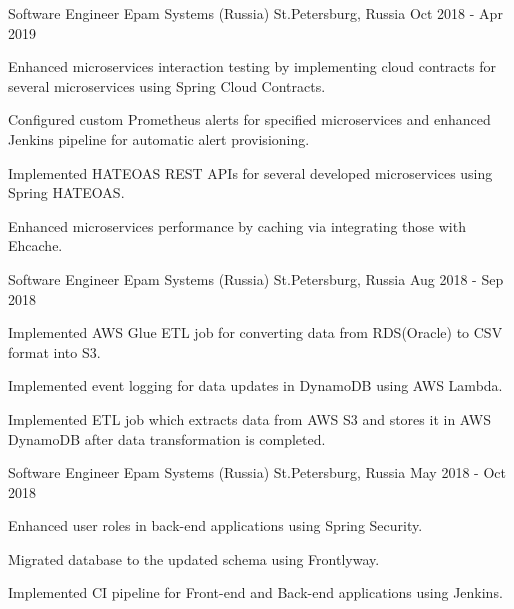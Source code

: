 \begin{cventries}
\cventry
{Software Engineer} %
{Epam Systems (Russia)} %
{St.Petersburg, Russia} %
{Oct 2018 - Apr 2019} %
{
  \begin{cvitems} %
    \item { Enhanced microservices interaction testing by implementing cloud contracts for several microservices using Spring Cloud Contracts.}
    \item {Configured custom Prometheus alerts for specified microservices and enhanced Jenkins pipeline for automatic alert provisioning.}
    \item {Implemented HATEOAS  REST APIs for several developed microservices using Spring HATEOAS.}
    \item {Enhanced microservices performance by caching via integrating those with Ehcache.}
  \end{cvitems}
}

\cventry
{Software Engineer} %
{Epam Systems (Russia)} %
{St.Petersburg, Russia} %
{Aug 2018 - Sep 2018} %
{
  \begin{cvitems} %
    \item {Implemented AWS Glue ETL job for converting data from RDS(Oracle) to CSV format into S3.}
    \item {Implemented event logging for data updates in DynamoDB using AWS Lambda.}
    \item {Implemented ETL job which extracts data from AWS S3 and stores it in AWS DynamoDB after data transformation is completed.}
  \end{cvitems}
}

\cventry
{Software Engineer} %
{Epam Systems (Russia)} %
{St.Petersburg, Russia} %
{May 2018 - Oct 2018} %
{
  \begin{cvitems} %
    \item {Enhanced user roles in back-end applications using Spring Security.}
    \item {Migrated database to the updated schema using Frontlyway.}
    \item {Implemented CI pipeline for Front-end and Back-end applications using Jenkins.}
  \end{cvitems}
}

\end{cventries}
